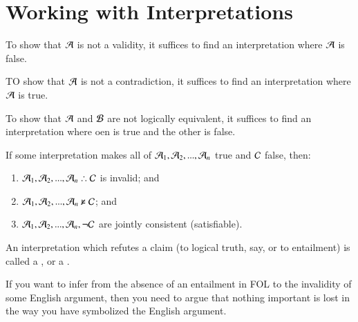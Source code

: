 \documentclass[12pt, a4paper, twoside, openright, titlepage]{book}
\begin{document}
\section{\textsection Working with Interpretations}

\begin{rmk}{}{}
    To show that $\mathcal{A}$ is not a validity, it suffices to find an interpretation where $\mathcal{A}$ is false.

    TO show that $\mathcal{A}$ is not a contradiction, it suffices to find an interpretation where $\mathcal{A}$ is true.
\end{rmk}


\begin{rmk}{}{}
    To show that $\mathcal{A}$ and $\mathcal{B}$ are not logically equivalent, it suffices to find an interpretation where oen is true and the other is false.
\end{rmk}


\begin{rmk}{}{}
    If some interpretation makes all of $\mathcal{A}_1,\mathcal{A}_2,...,\mathcal{A}_n$ true and $\mathcal{C}$ false, then: \begin{enumerate}
        \item $\metav{A}_1,\metav{A}_2,...,\metav{A}_n\therefore\metav{C}$ is invalid; and
        \item $\mathcal{A}_1,\mathcal{A}_2,...,\mathcal{A}_n\nvDash \mathcal{C}$; and
        \item $\mathcal{A}_1,\mathcal{A}_2,...,\mathcal{A}_n,\neg\mathcal{C}$ are jointly consistent (satisfiable).
    \end{enumerate}
\end{rmk}


\begin{defn}{}{}
    An interpretation which refutes a claim (to logical truth, say, or to entailment) is called a , or a .
\end{defn}

\begin{rmk}{}{}
    If you want to infer from the absence of an entailment in FOL to the invalidity of some English argument, then you need to argue that nothing important is lost in the way you have symbolized the English argument.
\end{rmk}
\end{document}
